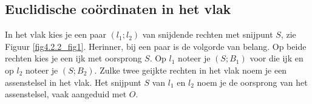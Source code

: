 \subsection{Euclidische co\"ordinaten in het vlak}

In het vlak kies je een paar $(l_1;l_2)$ van snijdende rechten met snijpunt $S$, zie Figuur \ref{fig4.2.2_fig1}.
Herinner, bij een paar is de volgorde van belang.
Op beide rechten kies je een ijk met oorsprong $S$.
Op $l_1$ noteer je $(S;B_1)$ voor die ijk en op $l_2$ noteer je $(S;B_2)$.
Zulke twee geijkte rechten in het vlak noem je een assenstelsel in het vlak.
Het snijpunt $S$ van $l_1$ en $l_2$ noem je de oorsprong van het assenstelsel, vaak aangeduid met $O$.

\begin{center}
\end{center}



